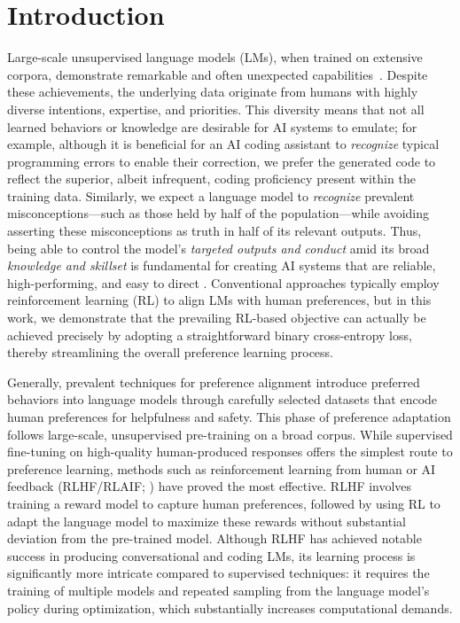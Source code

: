 \section{Introduction}
Large-scale unsupervised language models (LMs), when trained on extensive corpora, demonstrate remarkable and often unexpected capabilities~\citep{chowdhery2022palm, brown2020language, touvron2023llama,bubeck2023sparks}. Despite these achievements, the underlying data originate from humans with highly diverse intentions, expertise, and priorities. This diversity means that not all learned behaviors or knowledge are desirable for AI systems to emulate; for example, although it is beneficial for an AI coding assistant to \textit{recognize} typical programming errors to enable their correction, we prefer the generated code to reflect the superior, albeit infrequent, coding proficiency present within the training data. Similarly, we expect a language model to \textit{recognize} prevalent misconceptions—such as those held by half of the population—while avoiding asserting these misconceptions as truth in half of its relevant outputs. Thus, being able to control the model’s \emph{targeted outputs and conduct} amid its broad \textit{knowledge and skillset} is fundamental for creating AI systems that are reliable, high-performing, and easy to direct \citep{ouyang2022training}. Conventional approaches typically employ reinforcement learning (RL) to align LMs with human preferences, but in this work, we demonstrate that the prevailing RL-based objective can actually be achieved precisely by adopting a straightforward binary cross-entropy loss, thereby streamlining the overall preference learning process.

Generally, prevalent techniques for preference alignment introduce preferred behaviors into language models through carefully selected datasets that encode human preferences for helpfulness and safety. This phase of preference adaptation follows large-scale, unsupervised pre-training on a broad corpus. While supervised fine-tuning on high-quality human-produced responses offers the simplest route to preference learning, methods such as reinforcement learning from human or AI feedback (RLHF/RLAIF; \citep{christiano2017deep,bai2022constitutional}) have proved the most effective. RLHF involves training a reward model to capture human preferences, followed by using RL to adapt the language model to maximize these rewards without substantial deviation from the pre-trained model. Although RLHF has achieved notable success in producing conversational and coding LMs, its learning process is significantly more intricate compared to supervised techniques: it requires the training of multiple models and repeated sampling from the language model’s policy during optimization, which substantially increases computational demands.

